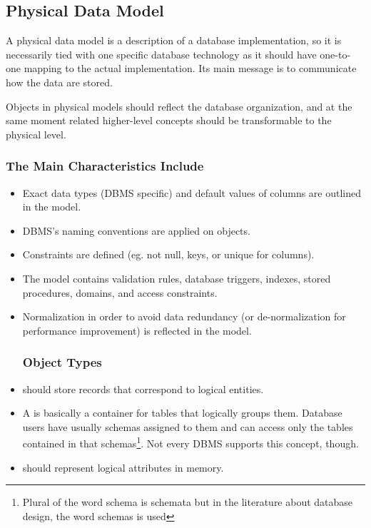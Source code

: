 \subsection{Physical Data Model}

A physical data model is a description of a database implementation, so it is necessarily tied with one specific database technology as it should have one-to-one mapping to the actual implementation. Its main message is to communicate how the data are stored.

Objects in physical models should reflect the database organization, and at the same moment related higher-level concepts should be transformable to the physical level.

\subsubsection{The Main Characteristics Include}
\begin{itemize}
	\item Exact data types (DBMS specific) and default values of columns are outlined in the model.
	\item DBMS's naming conventions are applied on objects.
	\item Constraints are defined (eg. not null, keys, or unique for columns).
	\item The model contains validation rules, database triggers, indexes, stored procedures, domains, and access constraints.
	\item Normalization in order to avoid data redundancy (or de-normalization for performance improvement) is reflected in the model.
	\subsubsection{Object Types}
	\item {} should store records that correspond to logical entities.
	\item A  is basically a container for tables that logically groups them. Database users have usually schemas assigned to them and can access only the tables contained in that schemas\footnote{Plural of the word schema is schemata but in the literature about database design, the word schemas is used}. Not every DBMS supports this concept, though.
	\item {} should represent logical attributes in memory.
\end{itemize}

